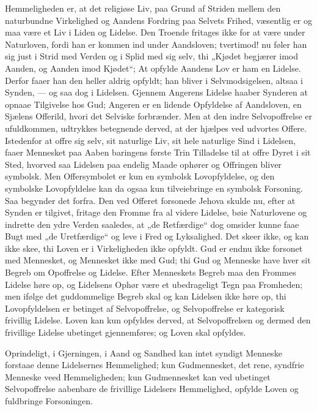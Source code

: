 \documentclass[12pt]{book}
\begin{document}
Hemmeligheden er, at det religiøse Liv, paa Grund af Striden mellem
den naturbundne Virkelighed og Aandens Fordring paa Selvets Frihed,
væsentlig er og maa være et Liv i Liden og Lidelse. Den Troende
fritages ikke for at være under Naturloven, fordi han er kommen ind
under Aandsloven; tvertimod! nu føler han sig just i Strid med
Verden og i Splid med sig selv, thi „Kjødet begjærer imod Aanden, og
Aanden imod Kjødet“; At opfylde Aandens Lov er ham en Lidelse.
Derfor faaer han den heller aldrig opfyldt; han bliver i
Selvmodsigelsen, altsaa i Synden, --- og saa dog i Lidelsen. Gjennem
Angerens Lidelse haaber Synderen at opnaae Tilgivelse hos Gud;
Angeren er en lidende Opfyldelse af Aandsloven, en Sjælens
Offerild, hvori det Selviske forbrænder. Men at den indre
Selvopoffrelse er ufuldkommen, udtrykkes betegnende derved, at der
hjælpes ved udvortes Offere. Istedenfor at offre sig selv, sit
naturlige Liv, sit hele naturlige Sind i Lidelsen, faaer Mennesket
paa Aaben\-
baringens første Trin Tilladelse til at offre Dyret i sit Sted,
hvorved saa Lidelsen paa endelig Maade ophører og Offringen bliver
symbolsk. Men Offersymbolet er kun en symbolsk Lovopfyldelse, og den
symbolske Lovopfyldelse kan da ogsaa kun tilveiebringe en symbolsk
Forsoning. Saa begynder det forfra. Den ved Offeret forsonede Jehova
skulde nu, efter at Synden er tilgivet, fritage den Fromme fra al
videre Lidelse, bøie Naturlovene og indrette den ydre Verden
saaledes, at „de Retfærdige“ dog omsider kunne faae Bugt med „de
Uretfærdige“ og leve i Fred og Lyksalighed. Det skeer ikke, og kan
ikke skee, thi Loven er i Virkeligheden ikke opfyldt. Gud er endnu
ikke forsonet med Mennesket, og Mennesket ikke med Gud; thi Gud og
Menneske have hver sit Begreb om Opoffrelse og Lidelse. Efter
Menneskets Begreb maa den Frommes Lidelse høre op, og Lidelsens
Ophør være et ubedrageligt Tegn paa Fromheden; men ifølge det
guddommelige Begreb skal og kan Lidelsen ikke høre op, thi
Lovopfyldelsen er betinget af Selvopoffrelse, og Selvopoffrelse er
kategorisk frivillig Lidelse. Loven kan kun opfyldes derved, at
Selvopoffrelsen og dermed den frivillige Lidelse ubetinget
gjennemføres; og Loven skal opfyldes.

Oprindeligt, i Gjerningen, i Aand og Sandhed kan intet syndigt
Menneske forstaae denne Lidelsernes Hemmelighed; kun Gudmennesket,
det rene, syndfrie Menneske veed Hemmeligheden; kun Gudmennesket kan
ved ubetinget Selvopoffrelse aabenbare de frivillige Lidelsers
Hemmelighed, opfylde Loven og fuldbringe Forsoningen.
\end{document}
